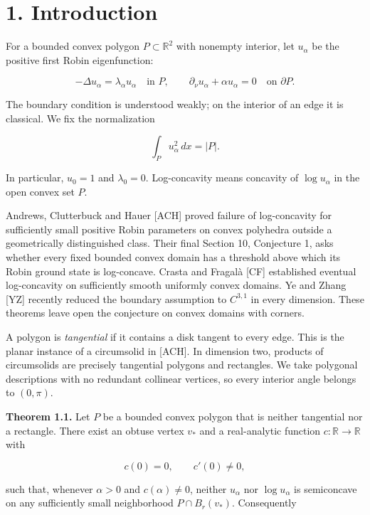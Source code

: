 \documentclass[11pt]{article}
\begin{document}
\section{1. Introduction}\label{introduction}

For a bounded convex polygon \(P\subset\mathbb R^2\) with nonempty
interior, let \(u_\alpha\) be the positive first Robin eigenfunction:

\[
-\Delta u_\alpha=\lambda_\alpha u_\alpha\quad\text{in }P,
\qquad \partial_\nu u_\alpha+\alpha u_\alpha=0
\quad\text{on }\partial P.
\tag{1.1}
\]

The boundary condition is understood weakly; on the interior of an edge
it is classical. We fix the normalization

\[
\int_P u_\alpha^2\,dx=|P|.
\tag{1.2}
\]

In particular, \(u_0=1\) and \(\lambda_0=0\). Log-concavity means
concavity of \(\log u_\alpha\) in the open convex set \(P\).

Andrews, Clutterbuck and Hauer {[}ACH{]} proved failure of log-concavity
for sufficiently small positive Robin parameters on convex polyhedra
outside a geometrically distinguished class. Their final Section 10,
Conjecture 1, asks whether every fixed bounded convex domain has a
threshold above which its Robin ground state is log-concave. Crasta and
Fragalà {[}CF{]} established eventual log-concavity on sufficiently
smooth uniformly convex domains. Ye and Zhang {[}YZ{]} recently reduced
the boundary assumption to \(C^{3,1}\) in every dimension. These
theorems leave open the conjecture on convex domains with corners.

A polygon is \emph{tangential} if it contains a disk tangent to every
edge. This is the planar instance of a circumsolid in {[}ACH{]}. In
dimension two, products of circumsolids are precisely tangential
polygons and rectangles. We take polygonal descriptions with no
redundant collinear vertices, so every interior angle belongs to
\((0,\pi)\).

\textbf{Theorem 1.1.} Let \(P\) be a bounded convex polygon that is
neither tangential nor a rectangle. There exist an obtuse vertex \(v_*\)
and a real-analytic function \(c:\mathbb R\to\mathbb R\) with

\[
c(0)=0,\qquad c'(0)\ne0,
\tag{1.3}
\]

such that, whenever \(\alpha>0\) and \(c(\alpha)\ne0\), neither
\(u_\alpha\) nor \(\log u_\alpha\) is semiconcave on any sufficiently
small neighborhood \(P\cap B_r(v_*)\). Consequently
\end{document}
